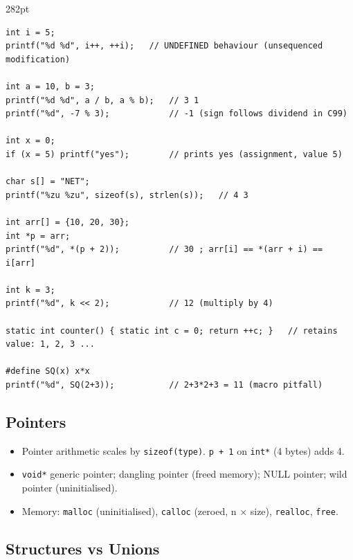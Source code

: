 \begin{listingblock}{282pt}
\begin{Verbatim}[fontsize=\fontsize{9.0}{10.9}\selectfont]
int i = 5;
printf("%d %d", i++, ++i);   // UNDEFINED behaviour (unsequenced modification)

int a = 10, b = 3;
printf("%d %d", a / b, a % b);   // 3 1
printf("%d", -7 % 3);            // -1 (sign follows dividend in C99)

int x = 0;
if (x = 5) printf("yes");        // prints yes (assignment, value 5)

char s[] = "NET";
printf("%zu %zu", sizeof(s), strlen(s));   // 4 3

int arr[] = {10, 20, 30};
int *p = arr;
printf("%d", *(p + 2));          // 30 ; arr[i] == *(arr + i) == i[arr]

int k = 3;
printf("%d", k << 2);            // 12 (multiply by 4)

static int counter() { static int c = 0; return ++c; }   // retains value: 1, 2, 3 ...

#define SQ(x) x*x
printf("%d", SQ(2+3));           // 2+3*2+3 = 11 (macro pitfall)
\end{Verbatim}
\end{listingblock}

\needspace{95pt}

\hypertarget{p2-03--23-pointers}{%
\subsection{Pointers}\label{p2-03--23-pointers}}



\begin{itemize}
\tightlist
\item
  Pointer arithmetic scales by \texttt{sizeof(type)}. \texttt{p\ +\ 1} on \texttt{int*} (4 bytes) adds 4.
\item
  \texttt{void*} generic pointer; dangling pointer (freed memory); NULL pointer; wild pointer (uninitialised).
\item
  Memory: \texttt{malloc} (uninitialised), \texttt{calloc} (zeroed, n × size), \texttt{realloc}, \texttt{free}.
\end{itemize}

\needspace{92pt}

\hypertarget{p2-03--24-structures-vs-unions}{%
\subsection{Structures vs Unions}\label{p2-03--24-structures-vs-unions}}

